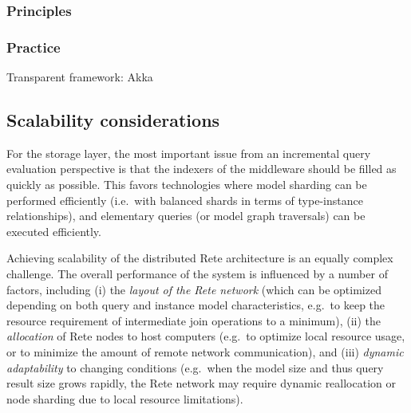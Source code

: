 \subsubsection{Principles}


\subsubsection{Practice}

Transparent framework: Akka







\subsection{Scalability considerations}
For the storage layer, the most important issue from an incremental query evaluation perspective is that the indexers of the middleware should be filled as quickly as possible. This favors technologies where model sharding can be performed efficiently (i.e.\ with balanced shards in terms of type-instance relationships), and elementary queries (or model graph traversals) can be executed efficiently.

Achieving scalability of the distributed Rete architecture is an equally complex challenge. The overall performance of the system is influenced by a number of factors, including (i) the \emph{layout of the Rete network} (which can be optimized depending on both query and instance model characteristics, e.g.\ to keep the resource requirement of intermediate join operations to a minimum), (ii) the \emph{allocation} of Rete nodes to host computers (e.g.\ to optimize local resource usage, or to minimize the amount of remote network communication), and (iii) \emph{dynamic adaptability} to changing conditions (e.g.\ when the model size and thus query result size grows rapidly, the Rete network may require dynamic reallocation or node sharding due to local resource limitations).

